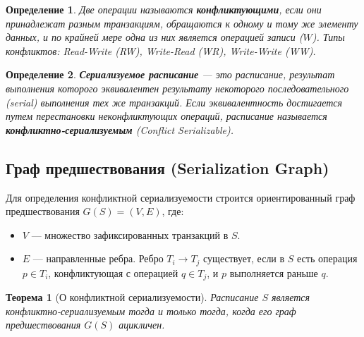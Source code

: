 \documentclass[a4paper,12pt]{article}
\newtheorem{theorem}{Теорема}
\newtheorem{definition}{Определение}
\begin{document}
\begin{definition}
Две операции называются \textbf{конфликтующими}, если они принадлежат разным транзакциям, обращаются к одному и тому же элементу данных, и по крайней мере одна из них является операцией записи ($W$).
Типы конфликтов: Read-Write (RW), Write-Read (WR), Write-Write (WW).
\end{definition}

\begin{definition}
\textbf{Сериализуемое расписание} — это расписание, результат выполнения которого эквивалентен результату некоторого последовательного (serial) выполнения тех же транзакций.
Если эквивалентность достигается путем перестановки неконфликтующих операций, расписание называется \textbf{конфликтно-сериализуемым} (Conflict Serializable).
\end{definition}

\subsection{Граф предшествования (Serialization Graph)}

Для определения конфликтной сериализуемости строится ориентированный граф предшествования $G(S) = (V, E)$, где:
\begin{itemize}
    \item $V$ — множество зафиксированных транзакций в $S$.
    \item $E$ — направленные ребра. Ребро $T_i \to T_j$ существует, если в $S$ есть операция $p \in T_i$, конфликтующая с операцией $q \in T_j$, и $p$ выполняется раньше $q$.
\end{itemize}

\begin{theorem}[О конфликтной сериализуемости]
\label{thm:serial}
Расписание $S$ является конфликтно-сериализуемым тогда и только тогда, когда его граф предшествования $G(S)$ ацикличен.
\end{theorem}
\end{document}
